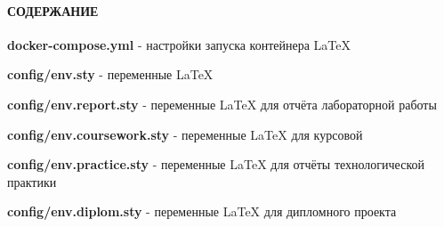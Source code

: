 \documentclass[12pt, a4paper, simple]{eskdtext}
\begin{document}
    

  \thispagestyle{plain}   %
  \pagestyle{plain}       %
  \hspace{0pt}

  \paragraph{СОДЕРЖАНИЕ} \hspace{0pt}

  \hspace{0pt}

  \textbf{docker-compose.yml} - настройки запуска контейнера LaTeX

  \textbf{config/env.sty} - переменные LaTeX

  \textbf{config/env.report.sty} - переменные LaTeX для отчёта лабораторной работы

  \textbf{config/env.coursework.sty} - переменные LaTeX для курсовой

  \textbf{config/env.practice.sty} - переменные LaTeX для отчёты технологической практики

  \textbf{config/env.diplom.sty} - переменные LaTeX для дипломного проекта

  \newpage

  

  

  

  \newpage
  

  \newpage
  

  \newpage
  
\end{document}

